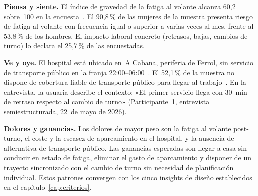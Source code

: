 \textbf{Piensa y siente.} El índice de gravedad de la fatiga al volante alcanza 60{,}2 sobre~100 en la encuesta~\parencite{LouridoRegueira2026}. El 90{,}8\,\% de las mujeres de la muestra presenta riesgo de fatiga al volante con frecuencia igual o superior a varias veces al mes, frente al 53{,}8\,\% de los hombres. El impacto laboral concreto (retrasos, bajas, cambios de turno) lo declara el 25{,}7\,\% de las encuestadas.

\textbf{Ve y oye.} El hospital está ubicado en~A Cabana, periferia de Ferrol, sin servicio de transporte público en la franja 22:00--06:00~\parencite{Alsaferrol2024horarios,RenfeCercaniasFerrol2026}. El 52{,}1\,\% de la muestra no dispone de cobertura fiable de transporte público para llegar al trabajo~\parencite{LouridoRegueira2026}. En la entrevista, la usuaria describe el contexto: «El primer servicio llega con 30~min de retraso respecto al cambio de turno» (Participante~1, entrevista semiestructurada, 22~de mayo de 2026).

\textbf{Dolores y ganancias.} Los dolores de mayor peso son la fatiga al volante post-turno, el coste y la escasez de aparcamiento en el hospital, y la ausencia de alternativa de transporte público. Las ganancias esperadas son llegar a casa sin conducir en estado de fatiga, eliminar el gasto de aparcamiento y disponer de un trayecto sincronizado con el cambio de turno sin necesidad de planificación individual. Estos patrones convergen con los cinco insights de diseño establecidos en el capítulo~\ref{cap:criterios}.
